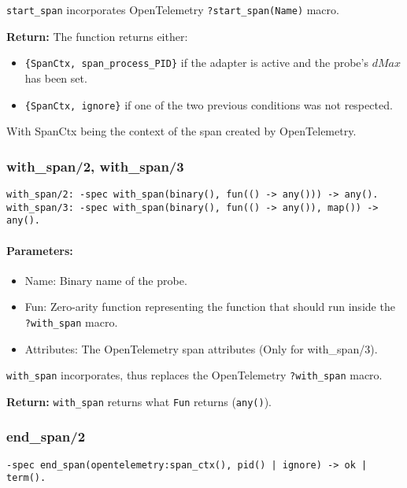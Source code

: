         \texttt{start\_span} incorporates OpenTelemetry \texttt{?start\_span(Name)} macro.
        
        \textbf{Return:} 
        The function returns either:
        \begin{itemize}
            \item  \texttt{\{SpanCtx, span\_process\_PID\}} if the adapter is active and the probe's $dMax$ has been set.
            \item \texttt{\{SpanCtx, ignore\}} if one of the two previous conditions was not respected.
        \end{itemize}
        With SpanCtx being the context of the span created by OpenTelemetry.
        
        \subsubsection{with\_span/2, with\_span/3}
        
        \begin{verbatim}
with_span/2: -spec with_span(binary(), fun(() -> any())) -> any().
with_span/3: -spec with_span(binary(), fun(() -> any()), map()) -> any().
        \end{verbatim}
         
        \paragraph{Parameters:}
            \begin{itemize}
                \item Name: Binary name of the probe.
                \item Fun: Zero-arity function representing the function that should run inside the \texttt{?with\_span} macro.
                \item Attributes: The OpenTelemetry span attributes (Only for with\_span/3).

            \end{itemize}

        \texttt{with\_span} incorporates, thus replaces the OpenTelemetry \texttt{?with\_span} macro.

        \textbf{Return:}
            \texttt{with\_span} returns what \texttt{Fun} returns (\texttt{any()}).
        
        \subsubsection{end\_span/2}
            \begin{verbatim}                
-spec end_span(opentelemetry:span_ctx(), pid() | ignore) -> ok | term().
            \end{verbatim}
